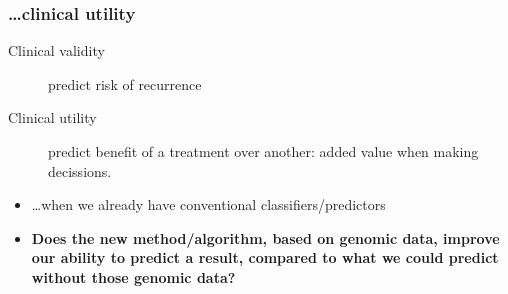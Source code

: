 \begin{frame}
\frametitle{\ldots clinical utility}
{\footnotesize
  \begin{description}
  \item[Clinical validity] predict risk of recurrence
  \item[Clinical utility] predict benefit of a treatment over another: added
    value when making decissions.
  \end{description}
}

\vspace*{20pt}

\begin{itemize}
  
\item \ldots when we already have conventional classifiers/predictors
  
  \vspace*{20pt}
  
\item \textbf{Does the new method/algorithm, based on genomic data,
    improve our ability to predict a result, compared to what we could
    predict without those genomic data?}
  
\end{itemize}
\end{frame}

